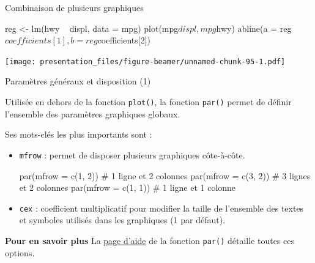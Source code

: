 \documentclass[12pt,handout,ignorenonframetext,]{beamer}
\newenvironment{Shaded}{}{}
\newcommand{\KeywordTok}[1]{\textcolor[rgb]{0.00,0.00,1.00}{#1}}
\newcommand{\DataTypeTok}[1]{#1}
\newcommand{\DecValTok}[1]{#1}
\newcommand{\StringTok}[1]{\textcolor[rgb]{0.00,0.50,0.50}{#1}}
\newcommand{\CommentTok}[1]{\textcolor[rgb]{0.00,0.50,0.00}{#1}}
\newcommand{\OperatorTok}[1]{#1}
\newcommand{\NormalTok}[1]{#1}
\renewenvironment{Shaded}{\begin{snugshade}}{\end{snugshade}}
\begin{document}
\begin{frame}[fragile]{Combinaison de plusieurs graphiques}

\footnotesize

\begin{Shaded}
\begin{Highlighting}[]
\NormalTok{reg <-}\StringTok{ }\KeywordTok{lm}\NormalTok{(hwy }\OperatorTok{~}\StringTok{ }\NormalTok{displ, }\DataTypeTok{data =}\NormalTok{ mpg)}
\KeywordTok{plot}\NormalTok{(mpg}\OperatorTok{$}\NormalTok{displ, mpg}\OperatorTok{$}\NormalTok{hwy)}
\KeywordTok{abline}\NormalTok{(}\DataTypeTok{a =}\NormalTok{ reg}\OperatorTok{$}\NormalTok{coefficients[}\DecValTok{1}\NormalTok{], }\DataTypeTok{b =}\NormalTok{ reg}\OperatorTok{$}\NormalTok{coefficients[}\DecValTok{2}\NormalTok{])}
\end{Highlighting}
\end{Shaded}

\texttt{[image: presentation\_files/figure-beamer/unnamed-chunk-95-1.pdf]}

\end{frame}

\begin{frame}[fragile]{Paramètres généraux et disposition (1)}

Utilisée en dehors de la fonction \texttt{plot()}, la fonction
\texttt{par()} permet de définir l'ensemble des paramètres graphiques
globaux.

\pause Ses mots-clés les plus importants sont :

\begin{itemize}
\item
  \texttt{mfrow} : permet de disposer plusieurs graphiques côte-à-côte.

\begin{Shaded}
\begin{Highlighting}[]
\KeywordTok{par}\NormalTok{(}\DataTypeTok{mfrow =} \KeywordTok{c}\NormalTok{(}\DecValTok{1}\NormalTok{, }\DecValTok{2}\NormalTok{)) }\CommentTok{# 1 ligne et 2 colonnes}
\KeywordTok{par}\NormalTok{(}\DataTypeTok{mfrow =} \KeywordTok{c}\NormalTok{(}\DecValTok{3}\NormalTok{, }\DecValTok{2}\NormalTok{)) }\CommentTok{# 3 lignes et 2 colonnes}
\KeywordTok{par}\NormalTok{(}\DataTypeTok{mfrow =} \KeywordTok{c}\NormalTok{(}\DecValTok{1}\NormalTok{, }\DecValTok{1}\NormalTok{)) }\CommentTok{# 1 ligne et 1 colonne}
\end{Highlighting}
\end{Shaded}
\item
  \texttt{cex} : coefficient multiplicatif pour modifier la taille de
  l'ensemble des textes et symboles utilisés dans les graphiques (1 par
  défaut).
\end{itemize}

\pause 

\textbf{Pour en savoir plus} La
\href{http://stat.ethz.ch/R-manual/R-devel/library/graphics/html/par.html}{page
d'aide} de la fonction \texttt{par()} détaille toutes ces options.

\end{frame}
\end{document}
